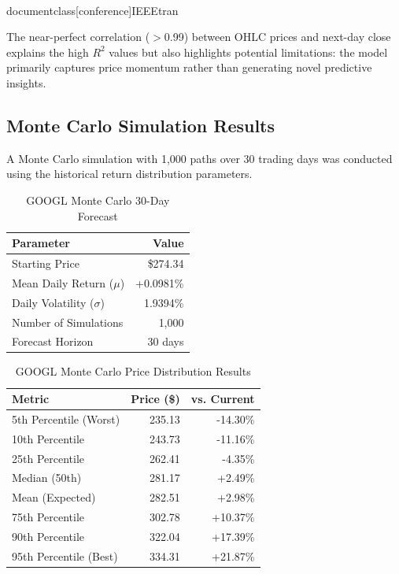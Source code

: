 \\documentclass[conference]{IEEEtran}
\begin{document}
The near-perfect correlation ($>$0.99) between OHLC prices and next-day close explains the high $R^2$ values but also highlights potential limitations: the model primarily captures price momentum rather than generating novel predictive insights.

\subsection{Monte Carlo Simulation Results}

A Monte Carlo simulation with 1,000 paths over 30 trading days was conducted using the historical return distribution parameters.

\begin{table}[H]
\caption{GOOGL Monte Carlo 30-Day Forecast}
\begin{center}
\begin{tabular}{|l|r|}
\hline
\textbf{Parameter} & \textbf{Value} \\
\hline
Starting Price & \$274.34 \\
\hline
Mean Daily Return ($\mu$) & +0.0981\% \\
\hline
Daily Volatility ($\sigma$) & 1.9394\% \\
\hline
Number of Simulations & 1,000 \\
\hline
Forecast Horizon & 30 days \\
\hline
\end{tabular}
\label{tab:googl_mc_params}
\end{center}
\end{table}

\begin{table}[H]
\caption{GOOGL Monte Carlo Price Distribution Results}
\begin{center}
\begin{tabular}{|l|r|r|}
\hline
\textbf{Metric} & \textbf{Price (\$)} & \textbf{vs. Current} \\
\hline
5th Percentile (Worst) & 235.13 & -14.30\% \\
\hline
10th Percentile & 243.73 & -11.16\% \\
\hline
25th Percentile & 262.41 & -4.35\% \\
\hline
Median (50th) & 281.17 & +2.49\% \\
\hline
Mean (Expected) & 282.51 & +2.98\% \\
\hline
75th Percentile & 302.78 & +10.37\% \\
\hline
90th Percentile & 322.04 & +17.39\% \\
\hline
95th Percentile (Best) & 334.31 & +21.87\% \\
\hline
\end{tabular}
\label{tab:googl_mc_results}
\end{center}
\end{table}
\end{document}
